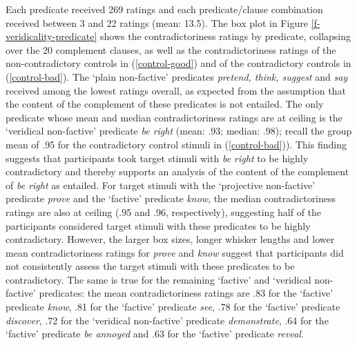 \documentclass[11pt,fleqn]{article}
\newcommand{\6}{\mbox{$[\hspace*{-.6mm}[$}}
\newcommand{\9}{\mbox{$]\hspace*{-.6mm}]$}}
\begin{document}
{Each predicate received 269 ratings and each predicate/clause combination received between 3 and 22 ratings (mean: 13.5). The box plot in Figure \ref{f-veridicality-predicate} shows the contradictoriness ratings by predicate, collapsing over the 20 complement clauses, as well as the contradictoriness ratings of the non-contradictory controls in (\ref{control-good}) and of the contradictory controls in (\ref{control-bad}). The `plain non-factive' predicates {\em pretend, think, suggest} and {\em say} received among the lowest ratings overall, as expected from the assumption that the content of the complement of these predicates is not entailed. The only predicate whose mean and median contradictoriness ratings are at ceiling is the `veridical non-factive' predicate {\em be right} (mean: .93; median: .98); recall the group mean of .95 for the contradictory control stimuli in (\ref{control-bad})). This finding suggests that participants took target stimuli with {\em be right} to be highly contradictory and thereby supports an analysis of the content of the complement of {\em be right} as entailed. For target stimuli with the `projective non-factive' predicate {\em prove} and the `factive' predicate {\em know}, the median contradictoriness ratings are also at ceiling (.95 and .96, respectively), suggesting half of the participants considered target stimuli with these predicates to be highly contradictory. However, the larger box sizes, longer whisker lengths and lower mean contradictoriness ratings for {\em prove} and {\em know} suggest that participants did not consistently assess the target stimuli with these predicates to be contradictory. The same is true for the remaining `factive' and `veridical non-factive' predicates: the mean contradictoriness ratings are .83 for the `factive' predicate {\em know}, .81 for the `factive' predicate {\em see}, .78 for the `factive' predicate {\em discover}, .72 for the `veridical non-factive' predicate {\em demonstrate}, .64 for the `factive' predicate {\em be annoyed} and .63 for the `factive' predicate {\em reveal}.  


}
\end{document}
